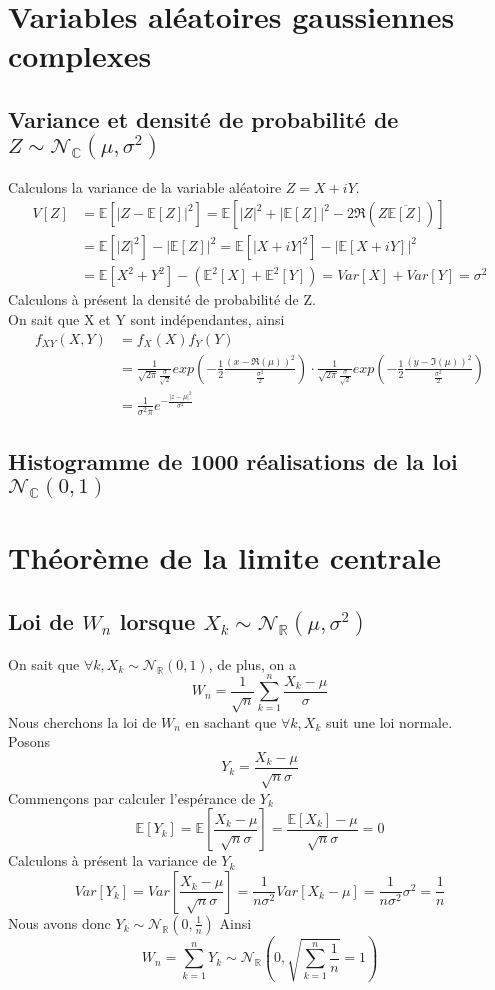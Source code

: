 \documentclass{report}
\begin{document}
	\section{Variables aléatoires gaussiennes complexes}
		\subsection{Variance et densité de probabilité de $Z \sim \mathcal{N}_{\mathbb{C}}(\mu, \sigma^2)$}
			Calculons la variance de la variable aléatoire $Z = X + iY$.
			\begin{align*}
				V[Z] &= \mathbb{E}\left[|Z-\mathbb{E}[Z]|^2\right] = \mathbb{E}\left[|Z|^2+|\mathbb{E}[Z]|^2-2\Re(Z\overline{\mathbb{E}[Z]})\right]\\
				&= \mathbb{E}[|Z|^2]-|\mathbb{E}[Z]|^2 = \mathbb{E}[|X+iY|^2]-|\mathbb{E}[X+iY]|^2\\ 
				&= \mathbb{E}[X^2+Y^2] - (\mathbb{E}^2[X] + \mathbb{E}^2[Y]) = Var[X] + Var[Y] = \sigma^2
			\end{align*}
			Calculons à présent la densité de probabilité de Z.\\
			On sait que X et Y sont indépendantes, ainsi
			\begin{align*}
				f_{XY}(X,Y) &= f_X(X)f_Y(Y)\\
				&= \frac{1}{\sqrt{2\pi}\frac{\sigma}{\sqrt{2}}}exp(-\frac{1}{2}\frac{(x-\Re(\mu))^2}{\frac{\sigma^2}{2}}) \cdot \frac{1}{\sqrt{2\pi}\frac{\sigma}{\sqrt{2}}}exp(-\frac{1}{2}\frac{(y-\Im(\mu))^2}{\frac{\sigma^2}{2}})\\
				&= \frac{1}{\sigma^2\pi}e^{-\frac{|z-\mu|^2}{\sigma^2}}
			\end{align*}
		\subsection{Histogramme de 1000 réalisations de la loi $\mathcal{N}_{\mathbb{C}}(0, 1)$}
		
	\section{Théorème de la limite centrale}
		\subsection{Loi de $W_n$ lorsque $X_k \sim \mathcal{N}_{\mathbb{R}}(\mu, \sigma^2)$}
			On sait que $\forall k, X_k \sim \mathcal{N}_{\mathbb{R}}(0, 1)$, de plus, on a 
			\[ W_n = \frac{1}{\sqrt{n}} \sum\limits_{k=1}^n \frac{X_k - \mu}{\sigma} \]
			Nous cherchons la loi de $W_n$ en sachant que $\forall k, X_k$ suit une loi normale. \\
			Posons 
			\[ Y_k = \frac{X_k - \mu}{\sqrt{n}\sigma} \]
			Commençons par calculer l'espérance de $Y_k$
			\[ \mathbb{E}[Y_k] = \mathbb{E}\left[ \frac{X_k - \mu}{\sqrt{n}\sigma} \right] = \frac{\mathbb{E}[X_k] - \mu}{\sqrt{n}\sigma} = 0 \]
			Calculons à présent la variance de $Y_k$
			\[ Var[Y_k] = Var\left[ \frac{X_k - \mu}{\sqrt{n}\sigma} \right] = \frac{1}{n\sigma^2}Var[X_k-\mu] = \frac{1}{n\sigma^2}\sigma^2 = \frac{1}{n} \]
			Nous avons donc $Y_k \sim \mathcal{N}_{\mathbb{R}}(0, \frac{1}n{})$
			Ainsi
			\[ W_n = \sum\limits_{k=1}^n Y_k \sim \mathcal{N}_{\mathbb{R}}(0, \sqrt{\sum\limits_{k=1}^n\frac{1}{n}} = 1) \]
\end{document}
